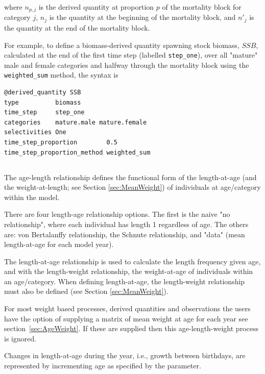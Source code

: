 where $n_{p,j}$ is the derived quantity at proportion $p$ of the mortality block for category $j$, $n_j$ is the quantity at the beginning of the mortality block, and $n'_j$ is the quantity at the end of the mortality block.

For example, to define a biomass-derived quantity spawning stock biomass, $SSB$, calculated at the end of the first time step (labelled \texttt{step\_one}), over all "mature" male and female categories and halfway through the mortality block using the \texttt{weighted\_sum} method, the syntax is

{\small{\begin{verbatim}
@derived_quantity SSB
type          biomass
time_step     step_one
categories    mature.male mature.female
selectivities One
time_step_proportion        0.5
time_step_proportion_method weighted_sum
\end{verbatim}}}

\subsection{\label{sec:AgeLength}}

The age-length relationship defines the functional form of the length-at-age (and the weight-at-length; see Section \ref{sec:MeanWeight}) of individuals at age/category within the model.

There are four length-age relationship options. The first is the naive "no relationship", where each individual has length 1 regardless of age. The others are:  von Bertalanffy relationship, the Schnute relationship, and "data" (mean length-at-age for each model year).

The length-at-age relationship is used to calculate the length frequency given age, and with the length-weight relationship, the weight-at-age of individuals within an age/category. When defining length-at-age, the length-weight relationship must also be defined (see Section \ref{sec:MeanWeight}).


For most weight based processes, derived quantities and observations the users have the option of supplying a matrix of mean weight at age for each year see section~\ref{sec:AgeWeight}. If these are supplied then this age-length-weight process is ignored.


Changes in length-at-age during the year, i.e., growth between birthdays, are represented by incrementing age as specified by the  parameter.
	
